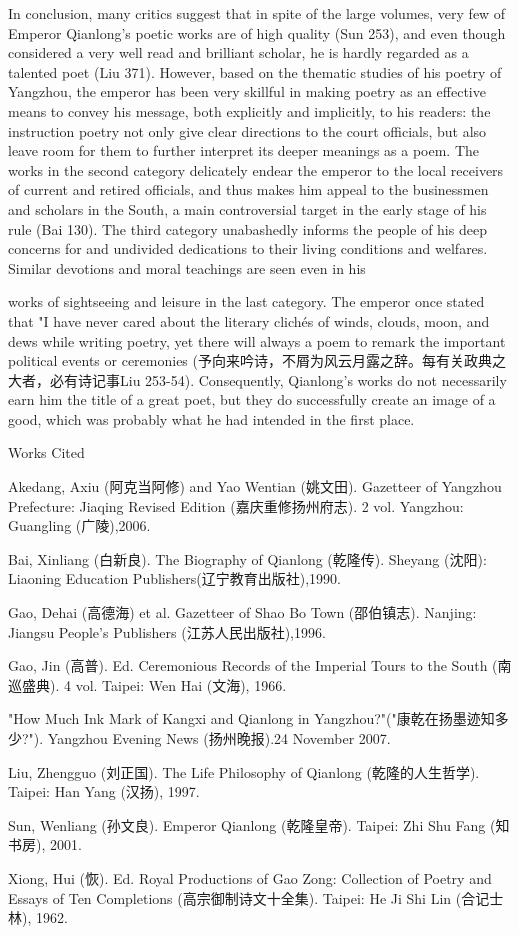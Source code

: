 In conclusion, many critics suggest that in spite of the large volumes, very few of Emperor Qianlong's poetic works are of high quality (Sun 253), and even though considered a very well read and brilliant scholar, he is hardly regarded as a talented poet (Liu 371). However, based on the thematic studies of his poetry of Yangzhou, the emperor has been very skillful in making poetry as an effective means to convey his message, both explicitly and implicitly, to his readers: the instruction poetry not only give clear directions to the court officials, but also leave room for them to further interpret its deeper meanings as a poem. The works in the second category delicately endear the emperor to the local receivers of current and retired officials, and thus makes him appeal to the businessmen and scholars in the South, a main controversial target in the early stage of his rule (Bai 130). The third category unabashedly informs the people of his deep concerns for and undivided dedications to their living conditions and welfares. Similar devotions and moral teachings are seen even in his


\noindent works of sightseeing and leisure in the last category. The emperor once stated that "I have never cared about the literary clichés of winds, clouds, moon, and dews while writing poetry, yet there will always a poem to remark the important political events or ceremonies (予向来吟诗，不屑为风云月露之辞。每有关政典之大者，必有诗记事Liu 253-54). Consequently, Qianlong's works do not necessarily earn him the title of a great poet, but they do successfully create an image of a good, which was probably what he had intended in the first place.


Works Cited

Akedang, Axiu (阿克当阿修) and Yao Wentian (姚文田). Gazetteer of Yangzhou Prefecture: Jiaqing Revised Edition (嘉庆重修扬州府志). 2 vol. Yangzhou: Guangling (广陵),2006.

Bai, Xinliang (白新良). The Biography of Qianlong (乾隆传). Sheyang (沈阳): Liaoning Education Publishers(辽宁教育出版社),1990.

Gao, Dehai (高德海) et al. Gazetteer of Shao Bo Town (邵伯镇志). Nanjing: Jiangsu People's Publishers (江苏人民出版社),1996.

Gao, Jin (高普). Ed. Ceremonious Records of the Imperial Tours to the South (南巡盛典). 4 vol. Taipei: Wen Hai (文海), 1966.

"How Much Ink Mark of Kangxi and Qianlong in Yangzhou?"("康乾在扬墨迹知多少?"). Yangzhou Evening News (扬州晚报).24 November 2007.

Liu, Zhengguo (刘正国). The Life Philosophy of Qianlong (乾隆的人生哲学). Taipei: Han Yang (汉扬), 1997.

Sun, Wenliang (孙文良). Emperor Qianlong (乾隆皇帝). Taipei: Zhi Shu Fang (知书房), 2001.

Xiong, Hui (恢). Ed. Royal Productions of Gao Zong: Collection of Poetry and Essays of Ten Completions (高宗御制诗文十全集). Taipei: He Ji Shi Lin (合记士林), 1962.


